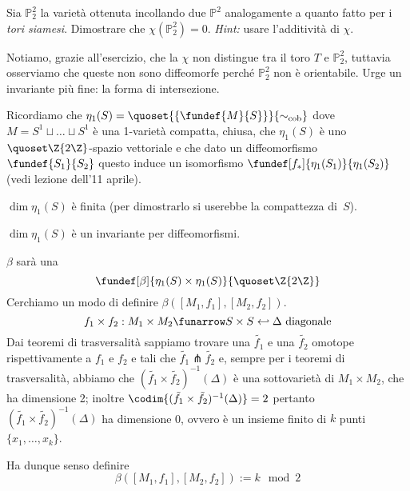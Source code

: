 \begin{ex}
	Sia $\mathbb{P}_2^2$ la varietà ottenuta incollando due $\mathbb{P}^2$ analogamente a quanto fatto per i \emph{tori siamesi}. Dimostrare che $\chi(\mathbb{P}_2^2) = 0$. \emph{Hint:} usare l'additività di $\chi$.
\end{ex}

\begin{oss}
Notiamo, grazie all'esercizio, che la $\chi$ non distingue tra il toro $T$ e $\mathbb{P}_2^2$, tuttavia osserviamo che queste non sono diffeomorfe perché $\mathbb{P}_2^2$ non è orientabile. Urge un invariante più fine: la forma di intersezione.
\end{oss}


Ricordiamo che $\eta_1(S) = \quoset{ \{ \fundef{M}{S} \} }{\sim_\text{cob}}$ dove $M = S^1 \sqcup \dots \sqcup S^1$ è una 1-varietà compatta, chiusa, che $\eta_1(S)$ è uno $\quoset\Z{2\Z}$-spazio vettoriale e che dato un diffeomorfismo $\fundef{S_1}{S_2}$ questo induce un isomorfismo $\fundef[f_*]{\eta_1(S_1)}{\eta_1(S_2)}$ (vedi lezione dell'11 aprile).

\begin{teo}
$\dim \eta_1(S)$ è finita (per dimostrarlo si userebbe la compattezza di~$S$).
\end{teo}

\begin{cor}
	$\dim \eta_1(S)$ è un invariante per diffeomorfismi.
\end{cor}

\begin{defn} $\beta$ sarà una \[ \fundef[\beta]{\eta_1(S) \times \eta_1(S)}{\quoset\Z{2\Z}} \] Cerchiamo un modo di definire $\beta([M_1,f_1],[M_2,f_2])$.
\[ f_1 \times f_2: M_1 \times M_2 \funarrow S \times S \hookleftarrow \Delta \text{ diagonale} \]
Dai teoremi di trasversalità sappiamo trovare una $\tilde{f_1}$ e una $\tilde{f_2}$ omotope rispettivamente a $f_1$ e $f_2$ e tali che $\tilde{f_1} \pitchfork \tilde{f_2}$ e, sempre per i teoremi di trasversalità, abbiamo che $(\tilde{f_1} \times \tilde{f_2})^{-1}(\Delta)$ è una sottovarietà di $M_1 \times M_2$, che ha dimensione 2; inoltre $\codim{(\tilde{f_1} \times \tilde{f_2})^{-1}(\Delta)} = 2$ pertanto $(\tilde{f_1} \times \tilde{f_2})^{-1}(\Delta)$ ha dimensione 0, ovvero è un insieme finito di $k$ punti $\{x_1, \dots , x_k \}$.

Ha dunque senso definire \[ \beta([M_1,f_1],[M_2,f_2]) := k \mod 2 \]
\end{defn}

